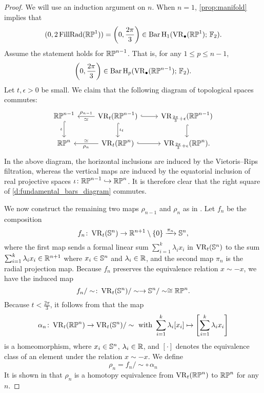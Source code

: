 \begin{proof}
	We will use an induction argument on $n$.
	When $n = 1$, \cref{prop:manifold} implies that
	\[
	(0, 2\operatorname{FillRad}(\mathbb{RP}^1)) = \left(0, \frac{2\pi}{3}\right) \in \operatorname{Bar} \operatorname{H}_{1}(\operatorname{VR}_\bullet(\mathbb{RP}^1);\,{\mathbb{F}_2}).
	\]
	Assume the statement holds for $\mathbb{RP}^{n-1}$.
	That is, for any $1 \leq p \leq n-1$,
	\[
	\left(0, \frac{2\pi}{3}\right) \in \operatorname{Bar} \operatorname{H}_{p}(\operatorname{VR}_\bullet(\mathbb{RP}^{n-1});\,{\mathbb{F}_2}).
	\]
	Let $t, \epsilon > 0$ be small.
	We claim that the following diagram of topological spaces commutes:
	\begin{equation}\label{d:fundamental_bars_diagram}
		\begin{tikzcd}
			\rp^{n-1}
			\ar[d, hook,"{\iota}" left]
			&
			\VR_t(\rp^{n-1})
			\ar[d, hook,"\iota_t"]
			\ar[l, "\rho_{n-1}" above, "\simeq" below]
			\ar[r, hook]
			&
			\VR_{\frac{2\pi}{3}+\epsilon}(\rp^{n-1})
			\ar[d, hook]
			\\
			\rp^{n}
			&
			\VR_t(\rp^{n})
			\ar[l, "\rho_n" below, "\simeq" above]
			\ar[r, hook]
			&
			\VR_{\frac{2\pi}{3}+\epsilon}(\rp^{n}).
		\end{tikzcd}
	\end{equation}
	In the above diagram, the horizontal inclusions are induced by the Vietoris--Rips filtration, whereas the vertical maps are induced by the equatorial inclusion of real projective spaces $\iota \colon \mathbb{RP}^{n-1} \hookrightarrow \mathbb{RP}^{n}$.
	It is therefore clear that the right square of \eqref{d:fundamental_bars_diagram} commutes.
	
	We now construct the remaining two maps $\rho_{n-1}$ and $\rho_{n}$ as in \cite[]{adams2022metric}.
	Let $f_n$ be the composition
	\[
	f_n \colon \operatorname{VR}_t(\mathbb{S}^n) \to \mathbb{R}^{n+1} \setminus \{0\} \xrightarrow{\pi_n} \mathbb{S}^{n},
	\]
	where the first map sends a formal linear sum $\sum_{i=1}^k \lambda_i x_i$ in $\operatorname{VR}_t(\mathbb{S}^n)$ to the sum $\sum_{i=1}^k \lambda_i x_i \in \mathbb{R}^{n+1}$ where $x_i \in \mathbb{S}^{n}$ and $\lambda_i \in \mathbb{R}$, and the second map $\pi_n$ is the radial projection map.
	Because $f_n$ preserves the equivalence relation $x \sim -x$, we have the induced map 
	\[
	f_n/\sim \colon \operatorname{VR}_t(\mathbb{S}^{n})/\sim\to \mathbb{S}^{n}/\sim\cong \mathbb{RP}^n.
	\]
	Because $t < \frac{2\pi}{3}$, it follows from \cite[Lemma 4.4]{adams2022metric} that the map
	\[
	\alpha_n \colon \operatorname{VR}_t(\mathbb{RP}^n) \to \operatorname{VR}_t(\mathbb{S}^n)/\sim \text{ with }
	\sum_{i=1}^k \lambda_i [x_i] \mapsto \left[\sum_{i=1}^k \lambda_i x_i\right]
	\]
	is a homeomorphism, where $x_i \in \mathbb{S}^{n}$, $\lambda_i \in \mathbb{R}$, and $[\cdot]$ denotes the equivalence class of an element under the relation $x \sim -x$.
	We define
	\[\rho_n = f_n/\sim \circ \,\alpha_n\]
	It is shown in \cite[Theorem 4.5]{adams2022metric} that $\rho_n$ is a homotopy equivalence from $\operatorname{VR}_t(\mathbb{RP}^n)$ to $\mathbb{RP}^n$ for any $n$.
	

\end{proof}
